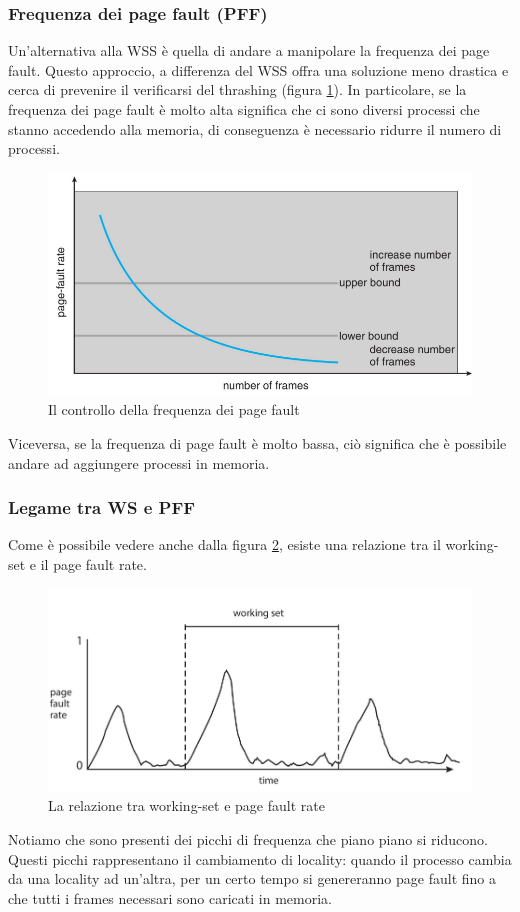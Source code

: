 \subsubsection{Frequenza dei page fault (PFF)}
Un'alternativa alla WSS è quella di andare a manipolare la frequenza dei page fault. Questo approccio, a differenza del WSS offra una soluzione meno drastica e cerca di prevenire il verificarsi del thrashing (figura \ref{fig:PFF}). In particolare, se la frequenza dei page fault è molto alta significa che ci sono diversi processi che stanno accedendo alla memoria, di conseguenza è necessario ridurre il numero di processi.
\begin{figure}[h]
    \centering
    \includegraphics[width = .5\textwidth]{../res/imgs/virtual memory/PFF.png}
    \caption{Il controllo della frequenza dei page fault}
    \label{fig:PFF}
\end{figure}
Viceversa, se la frequenza di page fault è molto bassa, ciò significa che è possibile andare ad aggiungere processi in memoria.

% 
\subsubsection*{Legame tra WS e PFF}
Come è possibile vedere anche dalla figura \ref{fig:WS_vs_PFF}, esiste una relazione tra il working-set e il page fault rate. 
\begin{figure}[h]
    \centering
    \includegraphics[width = .65\textwidth]{../res/imgs/virtual memory/WS_vs_PFF.png}
    \caption{La relazione tra working-set e page fault rate}
    \label{fig:WS_vs_PFF}
\end{figure}
Notiamo che sono presenti dei picchi di frequenza che piano piano si riducono. Questi picchi rappresentano il cambiamento di locality: quando il processo cambia da una locality ad un'altra, per un certo tempo si genereranno page fault fino a che tutti i frames necessari sono caricati in memoria.


